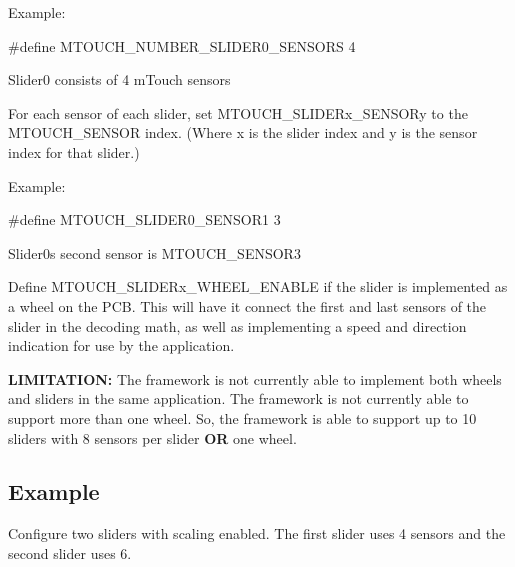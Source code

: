 \begin{DoxyEnumerate}
\begin{DoxyEnumerate}
\begin{DoxyItemize}
Example\+: 
\begin{DoxyCode}
\textcolor{preprocessor}{#define MTOUCH\_NUMBER\_SLIDER0\_SENSORS  4}
\end{DoxyCode}
 Slider0 consists of 4 m\+Touch sensors


\item For each sensor of each slider, set M\+T\+O\+U\+C\+H\+\_\+\+S\+L\+I\+D\+E\+Rx\+\_\+\+S\+E\+N\+S\+O\+Ry to the M\+T\+O\+U\+C\+H\+\_\+\+S\+E\+N\+S\+O\+R index. (Where \textquotesingle{}x\textquotesingle{} is the slider index and \textquotesingle{}y\textquotesingle{} is the sensor index for that slider.)

Example\+: 
\begin{DoxyCode}
\textcolor{preprocessor}{#define MTOUCH\_SLIDER0\_SENSOR1  3}
\end{DoxyCode}
 Slider0\textquotesingle{}s second sensor is M\+T\+O\+U\+C\+H\+\_\+\+S\+E\+N\+S\+O\+R3


\item Define M\+T\+O\+U\+C\+H\+\_\+\+S\+L\+I\+D\+E\+Rx\+\_\+\+W\+H\+E\+E\+L\+\_\+\+E\+N\+A\+B\+L\+E if the slider is implemented as a wheel on the P\+C\+B. This will have it connect the first and last sensors of the slider in the decoding math, as well as implementing a speed and direction indication for use by the application.


\end{DoxyItemize}
\end{DoxyEnumerate}
\end{DoxyEnumerate}

{\bfseries L\+I\+M\+I\+T\+A\+T\+I\+O\+N\+:} The framework is not currently able to implement both wheels and sliders in the same application. The framework is not currently able to support more than one wheel. So, the framework is able to support up to 10 sliders with 8 sensors per slider {\bfseries O\+R} one wheel.\hypertarget{feat_sliders_featSlider-Ex}{}\subsection{Example}\label{feat_sliders_featSlider-Ex}
Configure two sliders with scaling enabled. The first slider uses 4 sensors and the second slider uses 6.


